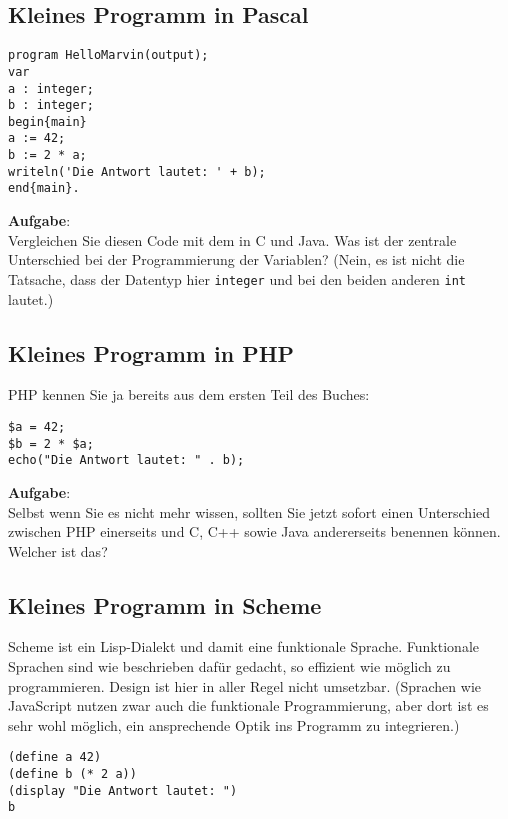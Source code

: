 \subsection{Kleines Programm in Pascal}

\begin{verbatim}
program HelloMarvin(output);
var
a : integer;
b : integer;
begin{main}
a := 42;
b := 2 * a;
writeln('Die Antwort lautet: ' + b);
end{main}.
\end{verbatim}

\textbf{Aufgabe}:\\

Vergleichen Sie diesen Code mit dem in C und Java. Was ist der zentrale Unterschied bei der Programmierung der Variablen? (Nein, es ist nicht die Tatsache, dass der Datentyp hier \verb|integer| und bei den beiden anderen \verb|int| lautet.)

\subsection{Kleines Programm in PHP}

PHP kennen Sie ja bereits aus dem ersten Teil des Buches:

\begin{verbatim}
$a = 42;
$b = 2 * $a;
echo("Die Antwort lautet: " . b);
\end{verbatim}

\textbf{Aufgabe}:\\

Selbst wenn Sie es nicht mehr wissen, sollten Sie jetzt sofort einen Unterschied zwischen PHP einerseits und C, C++ sowie Java andererseits benennen können. Welcher ist das?

\subsection{Kleines Programm in Scheme}

Scheme ist ein Lisp-Dialekt und damit eine funktionale Sprache. Funktionale Sprachen sind wie beschrieben dafür gedacht, so effizient wie möglich zu programmieren. Design ist hier in aller Regel nicht umsetzbar. (Sprachen wie JavaScript nutzen zwar auch die funktionale Programmierung, aber dort ist es sehr wohl möglich, ein ansprechende Optik ins Programm zu integrieren.)

\begin{verbatim}
(define a 42)
(define b (* 2 a))
(display "Die Antwort lautet: ")
b
\end{verbatim}

